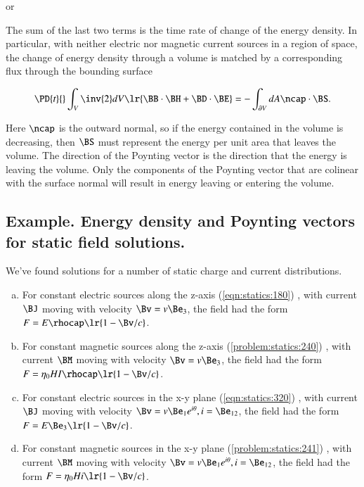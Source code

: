 or

The sum of the last two terms is the time rate of change of the energy density.
In particular,
with neither electric nor magnetic current sources in a region of space,
the change of energy density through a volume is matched by a corresponding flux through the bounding surface

\begin{dmath}\label{eqn:maxwellsEquations:740}
\PD{t}{} \int_V
\inv{2} dV \lr{
\BB \cdot \BH
+ \BD \cdot \BE
}
=
-\int_{\partial V} dA \ncap \cdot \BS.
\end{dmath}

Here \( \ncap \) is the outward normal, so if the energy contained in the volume is decreasing, then \( \BS \) must represent the energy per unit area that leaves the volume.
The direction of the Poynting vector is the direction that the energy is leaving the volume.
Only the components of the Poynting vector that are colinear with the surface normal will result in energy leaving or entering the volume.

\subsection{Example.  Energy density and Poynting vectors for static field solutions.}

We've found solutions for a number of static charge and current distributions.

\begin{enumerate}[(a)]
\item For constant electric sources along the z-axis
(\cref{eqn:statics:180})
, with current \( \BJ \) moving with velocity \( \Bv = v \Be_3 \), the field had the form \( F = E \rhocap \lr{ 1 - \Bv/c } \).
\item For constant magnetic sources along the z-axis
(\cref{problem:statics:240})
, with current \( \BM \) moving with velocity \( \Bv = v \Be_3 \), the field had the form \( F = \eta_0 H I \rhocap \lr{ 1 - \Bv/c } \).
\item For constant electric sources in the x-y plane
(\cref{eqn:statics:320})
, with current \( \BJ \) moving with velocity \( \Bv = v \Be_1 e^{i\theta}, i = \Be_{12} \), the field had the form \( F = E \Be_3 \lr{ 1 - \Bv/c } \).
\item For constant magnetic sources in the x-y plane
(\cref{problem:statics:241})
, with current \( \BM \) moving with velocity \( \Bv = v \Be_1 e^{i\theta}, i = \Be_{12} \), the field had the form \( F = \eta_0 H i \lr{ 1 - \Bv/c } \).
\end{enumerate}

